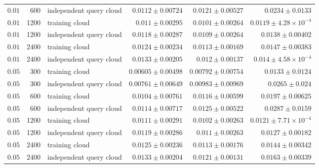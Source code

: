\begin{longtable}{r r L{0.25\textwidth} r r r}
$0.01$ & 600 & independent query cloud & $0.0112\pm 0.00724$ & $0.0121\pm 0.00527$ & $0.0234\pm 0.0133$ \\
$0.01$ & 1200 & training cloud & $0.011\pm 0.00295$ & $0.0101\pm 0.00264$ & $0.0119\pm 4.28\times10^{-4}$ \\
$0.01$ & 1200 & independent query cloud & $0.0118\pm 0.00287$ & $0.0109\pm 0.00264$ & $0.0138\pm 0.00402$ \\
$0.01$ & 2400 & training cloud & $0.0124\pm 0.00234$ & $0.0113\pm 0.00169$ & $0.0147\pm 0.00383$ \\
$0.01$ & 2400 & independent query cloud & $0.0133\pm 0.00205$ & $0.012\pm 0.00137$ & $0.014\pm 4.58\times10^{-4}$ \\
$0.05$ & 300 & training cloud & $0.00605\pm 0.00498$ & $0.00792\pm 0.00754$ & $0.0133\pm 0.0124$ \\
$0.05$ & 300 & independent query cloud & $0.00761\pm 0.00649$ & $0.00983\pm 0.00969$ & $0.0265\pm 0.024$ \\
$0.05$ & 600 & training cloud & $0.0104\pm 0.00761$ & $0.0116\pm 0.00599$ & $0.0197\pm 0.00625$ \\
$0.05$ & 600 & independent query cloud & $0.0114\pm 0.00717$ & $0.0125\pm 0.00522$ & $0.0287\pm 0.0159$ \\
$0.05$ & 1200 & training cloud & $0.0111\pm 0.00291$ & $0.0102\pm 0.00263$ & $0.0121\pm 7.71\times10^{-4}$ \\
$0.05$ & 1200 & independent query cloud & $0.0119\pm 0.00286$ & $0.011\pm 0.00263$ & $0.0127\pm 0.00182$ \\
$0.05$ & 2400 & training cloud & $0.0125\pm 0.00236$ & $0.0113\pm 0.00176$ & $0.0144\pm 0.00342$ \\
$0.05$ & 2400 & independent query cloud & $0.0133\pm 0.00204$ & $0.0121\pm 0.00131$ & $0.0163\pm 0.00339$ \\
\end{longtable}
\endgroup

